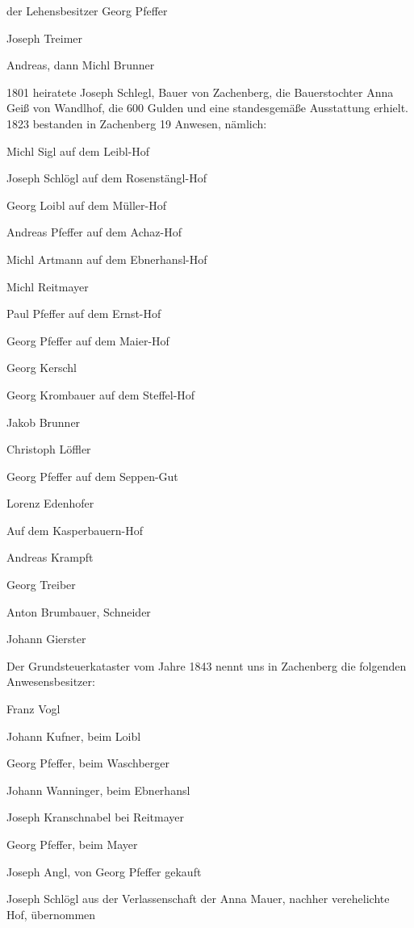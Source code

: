 \documentclass{book}
\begin{document}
der Lehensbesitzer Georg Pfeffer

Joseph Treimer

Andreas, dann Michl Brunner



1801 heiratete Joseph Schlegl, Bauer von Zachenberg, die Bauerstochter Anna Geiß
von Wandlhof, die 600 Gulden und eine standesgemäße Ausstattung erhielt. 1823
bestanden in Zachenberg 19 Anwesen, nämlich:



Michl Sigl auf dem Leibl-Hof

Joseph Schlögl auf dem Rosenstängl-Hof

Georg Loibl auf dem Müller-Hof

Andreas Pfeffer auf dem Achaz-Hof

Michl Artmann auf dem Ebnerhansl-Hof

Michl Reitmayer

Paul Pfeffer auf dem Ernst-Hof

Georg Pfeffer auf dem Maier-Hof

Georg Kerschl

Georg Krombauer auf dem Steffel-Hof

Jakob Brunner

Christoph Löffler

Georg Pfeffer auf dem Seppen-Gut

Lorenz Edenhofer

Auf dem Kasperbauern-Hof

Andreas Krampft

Georg Treiber

Anton Brumbauer, Schneider

Johann Gierster



Der Grundsteuerkataster vom Jahre 1843 nennt uns in Zachenberg die folgenden
Anwesensbesitzer:



Franz Vogl

Johann Kufner, beim Loibl

Georg Pfeffer, beim Waschberger

Johann Wanninger, beim Ebnerhansl

Joseph Kranschnabel bei Reitmayer

Georg Pfeffer, beim Mayer

Joseph Angl, von Georg Pfeffer gekauft

Joseph Schlögl aus der Verlassenschaft der Anna Mauer, nachher verehelichte Hof,
übernommen
\end{document}
